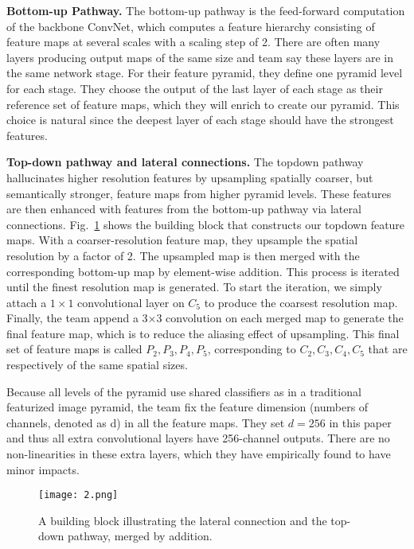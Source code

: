 \documentclass[10pt,twocolumn,letterpaper]{article}
\begin{document}
{\bfseries Bottom-up Pathway.} The bottom-up pathway is the feed-forward computation of the backbone ConvNet, which computes a feature hierarchy consisting of feature maps at several scales with a scaling step of 2. There are often many layers producing output maps of the same size and team say these layers are in the same network stage. For their feature pyramid, they define one pyramid level for each stage. They choose the output of the last layer of each stage as their reference set of feature maps, which they will enrich to create our pyramid. This choice is natural since the deepest layer of each stage should have the strongest features.

{\bfseries Top-down pathway and lateral connections.} The topdown pathway hallucinates higher resolution features by upsampling spatially coarser, but semantically stronger, feature maps from higher pyramid levels. These features are then enhanced with features from the bottom-up pathway via lateral connections. Fig.~\ref{fig:2} shows the building block that constructs our topdown feature maps. With a coarser-resolution feature map, they upsample the spatial resolution by a factor of 2. The upsampled map is then merged with the corresponding bottom-up map by element-wise addition. This process is iterated until the finest resolution map is generated. To start the iteration, we simply attach a $1\times 1$ convolutional layer on $C_5$ to produce the coarsest resolution map. Finally, the team append a 3×3 convolution on each merged map to generate the final feature map, which is to reduce the aliasing effect of upsampling. This final set of feature maps is called ${P_2, P_3, P_4, P_5}$, corresponding to ${C_2,C_3,C_4,C_5}$ that are respectively of the same spatial sizes.

Because all levels of the pyramid use shared classifiers as in a traditional featurized image pyramid, the team fix the feature dimension (numbers of channels, denoted as d) in all the feature maps. They set $d = 256$ in this paper and thus all extra convolutional layers have 256-channel outputs. There are no non-linearities in these extra layers, which they have empirically found to have minor impacts.

\begin{figure}
	\begin{center}
		\texttt{[image: 2.png]}
	\end{center}
	\caption{A building block illustrating the lateral connection and the top-down pathway, merged by addition.}
	\label{fig:2}
\end{figure}
\end{document}
